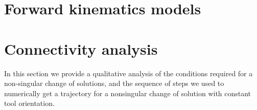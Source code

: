\documentclass[a4paper,12pt]{article}
\begin{document}
\section{Forward kinematics models}
\label{sec:fk-models}
\providecommand{\DHSectionFile}{sections/dh_parameters.tex}

\providecommand{\PoESectionFile}{sections/poe_model.tex}

\providecommand{\FKVerificationFile}{sections/fk_verification.tex}

\providecommand{\JacobianSectionFile}{sections/jacobian.tex}

\providecommand{\AnalyticalIKSectionFile}{sections/analytical_ik.tex}


\section{Connectivity analysis}
\label{sec:connectivity}
In this section we provide a qualitative analysis of the conditions required for a non-singular
change of solutions, and the sequence of steps we used to numerically get a trajectory for a
nonsingular change of solution with constant tool orientation.



\clearpage
\appendix

\end{document}
